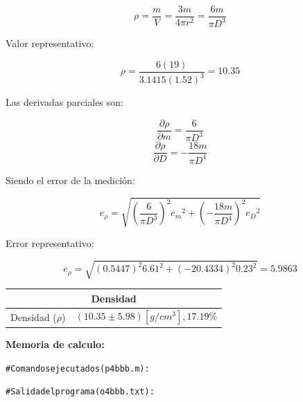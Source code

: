 \documentclass[letter,11pt]{article}
\begin{document}
\begin{enumerate}
    \begin{equation*}
        \rho = \frac{m}{V} = \frac{3 m}{4 \pi r^2} = \frac{6m}{\pi D^3}
    \end{equation*}

    Valor representativo:

    \begin{equation*}
        \rho = \frac{6 (19)}{3.1415 (1.52)^3} = 10.35
    \end{equation*}

    Las derivadas parciales son:

    \begin{equation*}
        \frac{\partial{\rho}}{\partial{m}} = \frac{6}{\pi D^3}
    \end{equation*}
    \begin{equation*}
        \frac{\partial{\rho}}{\partial{D}} = -\frac{18 m}{\pi D^4}
    \end{equation*}

    Siendo el error de la medición:

    \begin{equation*}
        e_{\rho} = \sqrt{
            \left(\frac{6}{\pi D^3}\right)^2{e_{m}}^2+
            \left(-\frac{18 m}{\pi D^4}\right)^2{e_{D}}^2
        }
    \end{equation*}

    Error representativo:

    \begin{equation*}
        e_{\rho} = \sqrt{
            \left(0.5447\right)^2{6.61}^2+
            \left(-20.4334\right)^2{0.23}^2
        } = 5.9863
    \end{equation*}

    \begin{center}
    \begin{tabular}{|c|>{\centering}m{5.0cm}<{\centering}|}
    \hline
    \multicolumn{2}{|c|}{\textbf{Densidad}}
    \tabularnewline \hline
    Densidad ($\rho$) & $(10.35 \pm 5.98)[g/cm^3], 17.19\%$ \tabularnewline \hline
    \end{tabular}
    \end{center}

    \vspace{1.0cm}
    \textbf{Memoria de calculo:}
    \begin{shaded}
        \begin{alltt}
            \footnotesize
\# Comandos ejecutados (p4bbb.m):


\# Salida del programa (o4bbb.txt):

            \normalsize
        \end{alltt}
    \end{shaded}

\end{enumerate}
\end{document}
